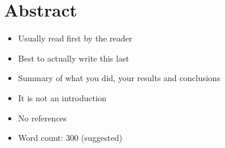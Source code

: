 \section{Abstract}
\begin{itemize}
\item Usually read first by the reader
\item Best to actually write this last
\item Summary of what you did, your results and conclusions
\item It is not an introduction
\item No references
\item Word count: 300 (suggested)
\end{itemize}